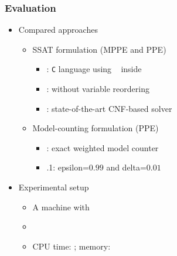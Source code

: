 \newcommand{\ncircuit}{\num{30}}

\begin{frame}
    \frametitle{Evaluation}
    \begin{itemize}
        \item Compared approaches
              \begin{itemize}
                  \item SSAT formulation (MPPE and PPE)
                        \begin{itemize}
                            \item \bddsp: \texttt{C} language using \cudd~\cite{CUDD} inside \abc~\cite{ABC}
                            \item \bddspnr: \bddsp without variable reordering
                            \item \dcssat: state-of-the-art CNF-based solver
                        \end{itemize}
                  \item Model-counting formulation (PPE)
                        \begin{itemize}
                            \item \cachet: exact weighted model counter
                            \item {}.1: epsilon=$0.99$ and delta=$0.01$
                        \end{itemize}
              \end{itemize}
              \pause
        \item Experimental setup
              \begin{itemize}
                  \item A machine with~\machineSpec
                  \item \osInfo
                  \item CPU time: \timelimit; memory: \memlimit
              \end{itemize}
    \end{itemize}
\end{frame}

